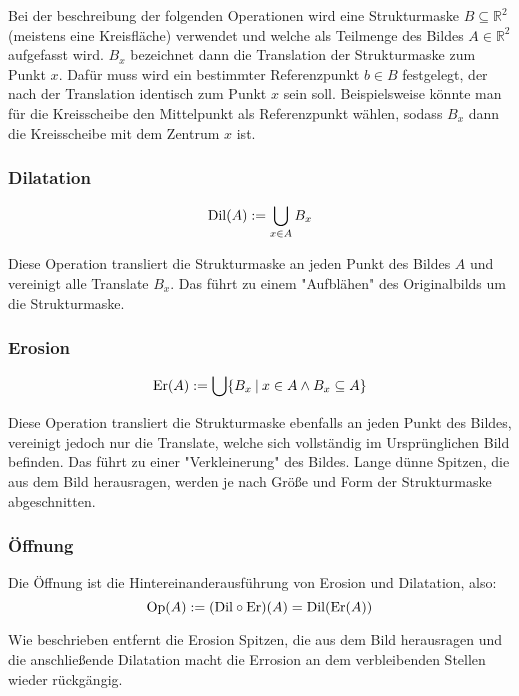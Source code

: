 \documentclass{article}
\newcommand{\R}[0]{\mathbb{R}}
\begin{document}
Bei der beschreibung der folgenden Operationen wird eine Strukturmaske $B \subseteq \R^2$ (meistens eine Kreisfläche) verwendet und welche als Teilmenge des Bildes $A \in \R^2$ aufgefasst wird.
$B_x$ bezeichnet dann die Translation der Strukturmaske zum Punkt $x$. Dafür muss wird ein bestimmter Referenzpunkt $b \in B$ festgelegt, der nach der Translation identisch zum Punkt $x$ sein soll.
Beispielsweise könnte man für die Kreisscheibe den Mittelpunkt als Referenzpunkt wählen, sodass $B_x$ dann die Kreisscheibe mit dem Zentrum $x$ ist.

\subsubsection{Dilatation}
\begin{equation}
    {\rm Dil}(A) := \bigcup\limits_{x \in A} B_x
\end{equation}

Diese Operation transliert die Strukturmaske an jeden Punkt des Bildes $A$ und vereinigt alle Translate $B_x$. Das führt zu einem "Aufblähen" des Originalbilds um die Strukturmaske.

\subsubsection{Erosion}
\begin{equation}
    {\rm Er}(A) := \bigcup \{B_x \: | \: x \in A \land B_x \subseteq A\}
\end{equation}

Diese Operation transliert die Strukturmaske ebenfalls an jeden Punkt des Bildes, vereinigt jedoch nur die Translate, welche sich vollständig im Ursprünglichen Bild befinden.
Das führt zu einer "Verkleinerung" des Bildes. Lange dünne Spitzen, die aus dem Bild herausragen, werden je nach Größe und Form der Strukturmaske abgeschnitten.

\subsubsection{Öffnung}

Die Öffnung ist die Hintereinanderausführung von Erosion und Dilatation, also:
\begin{equation}
    {\rm Op}(A) := ({\rm Dil} \circ {\rm Er})(A) = {\rm Dil}({\rm Er}(A))
\end{equation}

Wie beschrieben entfernt die Erosion Spitzen, die aus dem Bild herausragen und die anschließende Dilatation macht die Errosion an dem verbleibenden Stellen wieder rückgängig.
\end{document}
